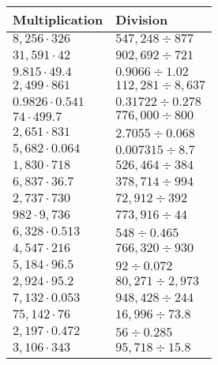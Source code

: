 \begin{longtable}[]{@{}ll@{}}
\toprule
Multiplication & Division\tabularnewline
\midrule
\endhead
\(8,256\cdot326\) & \(547,248÷877\)\tabularnewline
\(31,591\cdot42\) & \(902,692÷721\)\tabularnewline
\(9.815\cdot49.4\) & \(0.9066÷1.02\)\tabularnewline
\(2,499\cdot861\) & \(112,281÷8,637\)\tabularnewline
\(0.9826\cdot0.541\) & \(0.31722÷0.278\)\tabularnewline
\(74\cdot499.7\) & \(776,000÷800\)\tabularnewline
\(2,651\cdot831\) & \(2.7055÷0.068\)\tabularnewline
\(5,682\cdot0.064\) & \(0.007315÷8.7\)\tabularnewline
\(1,830\cdot718\) & \(526,464÷384\)\tabularnewline
\(6,837\cdot36.7\) & \(378,714÷994\)\tabularnewline
\(2,737\cdot730\) & \(72,912÷392\)\tabularnewline
\(982\cdot9,736\) & \(773,916÷44\)\tabularnewline
\(6,328\cdot0.513\) & \(548÷0.465\)\tabularnewline
\(4,547\cdot216\) & \(766,320÷930\)\tabularnewline
\(5,184\cdot96.5\) & \(92÷0.072\)\tabularnewline
\(2,924\cdot95.2\) & \(80,271÷2,973\)\tabularnewline
\(7,132\cdot0.053\) & \(948,428÷244\)\tabularnewline
\(75,142\cdot76\) & \(16,996÷73.8\)\tabularnewline
\(2,197\cdot0.472\) & \(56÷0.285\)\tabularnewline
\(3,106\cdot343\) & \(95,718÷15.8\)\tabularnewline
\bottomrule
\end{longtable}
